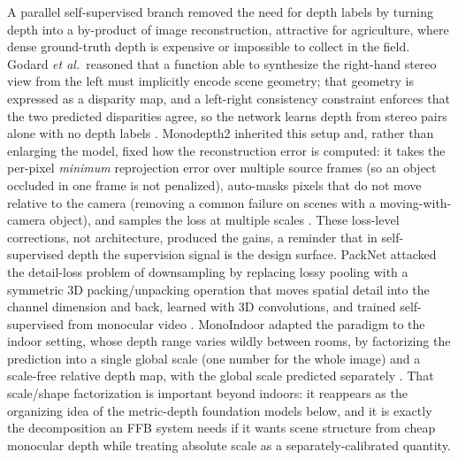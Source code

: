 A parallel self-supervised branch removed the need for depth labels by turning depth into a by-product of image reconstruction, attractive for agriculture, where dense ground-truth depth is expensive or impossible to collect in the field. Godard \textit{et al.}\ reasoned that a function able to synthesize the right-hand stereo view from the left must implicitly encode scene geometry; that geometry is expressed as a disparity map, and a left-right consistency constraint enforces that the two predicted disparities agree, so the network learns depth from stereo pairs alone with no depth labels \cite{godard2017monodepth}. Monodepth2 inherited this setup and, rather than enlarging the model, fixed how the reconstruction error is computed: it takes the per-pixel \emph{minimum} reprojection error over multiple source frames (so an object occluded in one frame is not penalized), auto-masks pixels that do not move relative to the camera (removing a common failure on scenes with a moving-with-camera object), and samples the loss at multiple scales \cite{godard2019monodepth2}. These loss-level corrections, not architecture, produced the gains, a reminder that in self-supervised depth the supervision signal is the design surface. PackNet attacked the detail-loss problem of downsampling by replacing lossy pooling with a symmetric 3D packing/unpacking operation that moves spatial detail into the channel dimension and back, learned with 3D convolutions, and trained self-supervised from monocular video \cite{guizilini2020packnet}. MonoIndoor adapted the paradigm to the indoor setting, whose depth range varies wildly between rooms, by factorizing the prediction into a single global scale (one number for the whole image) and a scale-free relative depth map, with the global scale predicted separately \cite{ji2021monoindoor}. That scale/shape factorization is important beyond indoors: it reappears as the organizing idea of the metric-depth foundation models below, and it is exactly the decomposition an FFB system needs if it wants scene structure from cheap monocular depth while treating absolute scale as a separately-calibrated quantity.

